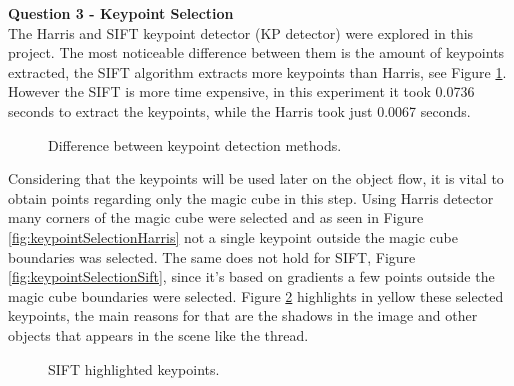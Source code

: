 \documentclass[12pt,a4paper]{article}
\begin{document}
\textbf{\LARGE Question 3 - Keypoint Selection} \\

The Harris and SIFT keypoint detector (KP detector) were explored in this project. The most noticeable difference between them is the amount of keypoints extracted, the SIFT algorithm extracts more keypoints than Harris, see Figure \ref{fig:keypointSelection}. However the SIFT is more time expensive, in this experiment it took 0.0736 seconds to extract the keypoints, while the Harris took just 0.0067 seconds. \\

\begin{figure}[!h]
	\centering
	\quad
	\caption{Difference between keypoint detection methods.}
	\label{fig:keypointSelection}
\end{figure}

Considering that the keypoints will be used later on the object flow, it is vital to obtain points regarding only the magic cube in this step. Using Harris detector many corners of the magic cube were selected and as seen in Figure \ref{fig:keypointSelectionHarris} not a single keypoint outside the magic cube boundaries was selected. The same does not hold for SIFT, Figure \ref{fig:keypointSelectionSift}, since it's based on gradients a few points outside the magic cube boundaries were selected. Figure \ref{fig:keypointSelectionSiftPoints} highlights in yellow  these selected  keypoints, the main reasons for that are the shadows in the image and other objects that appears in the scene like the thread.\\
	
\begin{figure}[!h]
	\centering
	{
		\setlength{\fboxsep}{1pt}
		\setlength{\fboxrule}{1pt}
	}
	\caption{SIFT highlighted keypoints.}
	\label{fig:keypointSelectionSiftPoints}
\end{figure}
\end{document}
